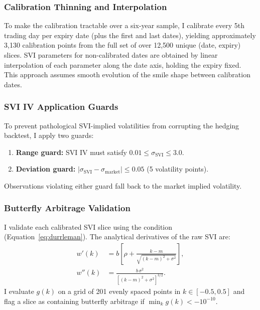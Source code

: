 \documentclass[12pt, letterpaper]{article}
\begin{document}
\subsubsection{Calibration Thinning and Interpolation}

To make the calibration tractable over a six-year sample, I calibrate every 5th trading day per expiry date (plus the first and last dates), yielding approximately 3,130 calibration points from the full set of over 12,500 unique (date, expiry) slices. SVI parameters for non-calibrated dates are obtained by linear interpolation of each parameter along the date axis, holding the expiry fixed. This approach assumes smooth evolution of the smile shape between calibration dates.

\subsubsection{SVI IV Application Guards}

To prevent pathological SVI-implied volatilities from corrupting the hedging backtest, I apply two guards:
\begin{enumerate}
    \item \textbf{Range guard:} SVI IV must satisfy $0.01 \leq \sigma_{\text{SVI}} \leq 3.0$.
    \item \textbf{Deviation guard:} $|\sigma_{\text{SVI}} - \sigma_{\text{market}}| \leq 0.05$ (5 volatility points).
\end{enumerate}
Observations violating either guard fall back to the market implied volatility.

\subsubsection{Butterfly Arbitrage Validation}

I validate each calibrated SVI slice using the \citet{Durrleman2005} condition (Equation~\ref{eq:durrleman}). The analytical derivatives of the raw SVI are:
\begin{align}
    w'(k) &= b\left[\rho + \frac{k - m}{\sqrt{(k - m)^2 + \sigma^2}}\right], \label{eq:svi_wprime} \\
    w''(k) &= \frac{b\, \sigma^2}{\left[(k - m)^2 + \sigma^2\right]^{3/2}}. \label{eq:svi_wdoubleprime}
\end{align}
I evaluate $g(k)$ on a grid of 201 evenly spaced points in $k \in [-0.5, 0.5]$ and flag a slice as containing butterfly arbitrage if $\min_k g(k) < -10^{-10}$.
\end{document}
